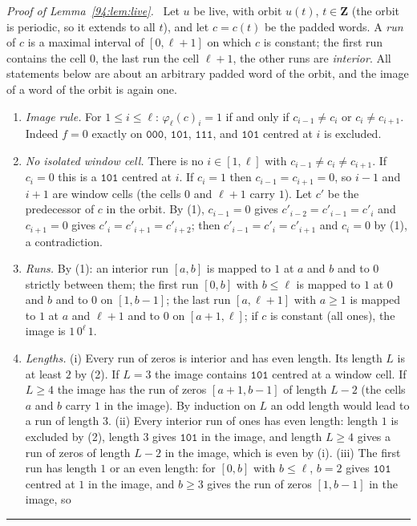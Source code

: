 \documentclass[10pt,a4paper]{article}
\newcommand{\qedmark}{\rule{1.1ex}{1.1ex}}
\newenvironment{proof}[1][Proof]{\par\smallskip\noindent\textit{#1.}\ }{\hfill\qedmark\par\smallskip}
\newcommand{\code}[1]{\mathtt{#1}}            %
\begin{document}
\begin{proof}[Proof of Lemma~\ref{94:lem:live}]
Let $u$ be live, with orbit $u(t)$, $t\in\mathbf{Z}$ (the orbit is periodic, so it extends to all $t$), and let
$c=c(t)$ be the padded words. A \emph{run} of $c$ is a maximal interval of $[0,\ell+1]$ on which $c$ is constant;
the first run contains the cell $0$, the last run the cell $\ell+1$, the other runs are \emph{interior}. All
statements below are about an arbitrary padded word of the orbit, and the image of a word of the orbit is again
one.
\begin{enumerate}[label=(\arabic*),leftmargin=*,nosep]
\item \emph{Image rule.} For $1\le i\le\ell$: $\varphi_\ell(c)_i=1$ if and only if $c_{i-1}\ne c_i$ or
$c_i\ne c_{i+1}$. Indeed $f=0$ exactly on $\code{000}$, $\code{101}$, $\code{111}$, and $\code{101}$ centred at
$i$ is excluded.
\item \emph{No isolated window cell.} There is no $i\in[1,\ell]$ with $c_{i-1}\ne c_i\ne c_{i+1}$. If $c_i=0$
this is a $\code{101}$ centred at $i$. If $c_i=1$ then $c_{i-1}=c_{i+1}=0$, so $i-1$ and $i+1$ are window cells
(the cells $0$ and $\ell+1$ carry $1$). Let $c'$ be the predecessor of $c$ in the orbit. By (1), $c_{i-1}=0$
gives $c'_{i-2}=c'_{i-1}=c'_i$ and $c_{i+1}=0$ gives $c'_i=c'_{i+1}=c'_{i+2}$; then $c'_{i-1}=c'_i=c'_{i+1}$ and
$c_i=0$ by (1), a contradiction.
\item \emph{Runs.} By (1): an interior run $[a,b]$ is mapped to $1$ at $a$ and $b$ and to $0$ strictly between
them; the first run $[0,b]$ with $b\le\ell$ is mapped to $1$ at $0$ and $b$ and to $0$ on $[1,b-1]$; the last run
$[a,\ell+1]$ with $a\ge1$ is mapped to $1$ at $a$ and $\ell+1$ and to $0$ on $[a+1,\ell]$; if $c$ is constant
(all ones), the image is $1\,0^\ell\,1$.
\item \emph{Lengths.} (i) Every run of zeros is interior and has even length. Its length $L$ is at least $2$ by
(2). If $L=3$ the image contains $\code{101}$ centred at a window cell. If $L\ge4$ the image has the run of zeros
$[a+1,b-1]$ of length $L-2$ (the cells $a$ and $b$ carry $1$ in the image). By induction on $L$ an odd length
would lead to a run of length $3$. (ii) Every interior run of ones has even length: length $1$ is excluded by (2),
length $3$ gives $\code{101}$ in the image, and length $L\ge4$ gives a run of zeros of length $L-2$ in the image,
which is even by (i). (iii) The first run has length $1$ or an even length: for $[0,b]$ with $b\le\ell$, $b=2$
gives $\code{101}$ centred at $1$ in the image, and $b\ge3$ gives the run of zeros $[1,b-1]$ in the image, so

\end{enumerate}
\end{proof}
\end{document}

